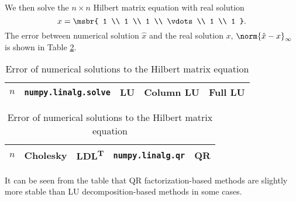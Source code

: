 \documentclass[english, nochinese]{pnote}
\begin{document}
We then solve the $ n \times n $ Hilbert matrix equation with real solution
\begin{equation}
x = \msbr{ 1 \\ 1 \\ 1 \\ \vdots \\ 1 \\ 1 }.
\end{equation}
The error between numerical solution $\hat{x}$ and the real solution $x$, $ \norm{ \hat{x} - x }_{\infty} $ is shown in Table \ref{Tbl:Hilbert}.

\begin{table}[htb]
\centering
\begin{tabular}{|c|c|c|c|c|}
\hline
$n$ & \verb"numpy.linalg.solve" & LU & Column LU & Full LU \\
\hline

\end{tabular}
\begin{tabular}{|c|c|c|c|c|}
\hline
$n$ & Cholesky & LDL\textsuperscript{T} & \verb"numpy.linalg.qr" & QR \\
\hline

\end{tabular}
\caption{Error of numerical solutions to the Hilbert matrix equation}
\label{Tbl:Hilbert}
\end{table}

It can be seen from the table that QR factorization-based methods are slightly more stable than LU decomposition-based methods in some cases.
\end{document}
